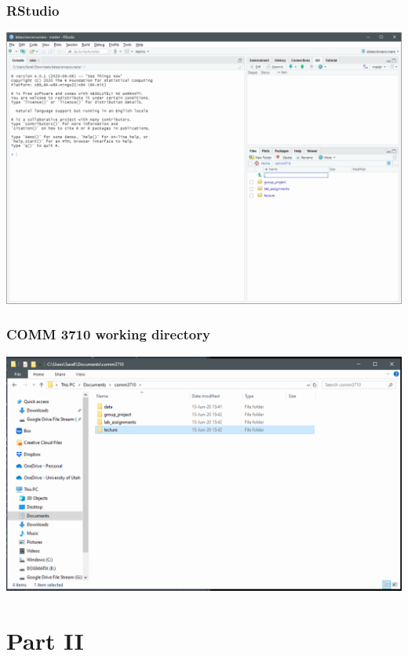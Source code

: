 \documentclass[
]{article}
\begin{document}
\hypertarget{rstudio}{%
\subsubsection{RStudio}\label{rstudio}}

\includegraphics{LA.1_RStudio.png}

\hypertarget{comm-3710-working-directory}{%
\subsubsection{COMM 3710 working
directory}\label{comm-3710-working-directory}}

\includegraphics{LA.1_workingdir.png}

\hypertarget{part-ii}{%
\section{Part II}\label{part-ii}}
\end{document}
